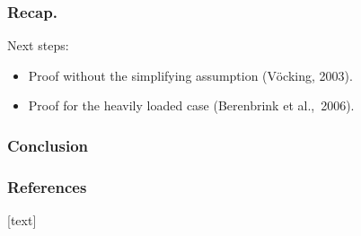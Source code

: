 \documentclass[serif,professionalfonts]{beamer}
\begin{document}
\begin{frame}
\frametitle{Recap.}
\theoremVocking
\assumptionOne
\bigskip 
Next steps:
\begin{itemize}
\item Proof \alert{without} the simplifying assumption (V\"ocking, 2003).
\item Proof for the \alert{heavily loaded} case (Berenbrink et al.,~2006).
\end{itemize}

\end{frame}


\begin{frame}
\frametitle{Conclusion}
\end{frame}

\begin{frame}[allowframebreaks]
\frametitle<presentation>{References}    

\nocite{VOC03}
\nocite{ABKU99}
\nocite{RS98}
\nocite{BCSV06}
\nocite{capocelli1990generalized}
[text]

\end{frame} 	
\end{document}
